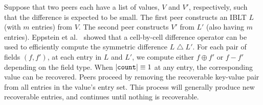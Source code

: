 Suppose that two peers each have a list of values, $V$ and $V'$,
respectively, such that the difference is expected to be small.  The
first peer constructs an IBLT $L$ (with $m$ entries) from $V$.  The
second peer constructs $V'$ from $L'$ (also having $m$ entries).
Eppstein et al.~\cite{eppstein:2011} showed that a cell-by-cell
difference operator can be used to efficiently compute the symmetric
difference $L \bigtriangleup L'$.  For each pair of fields $(f, f')$,
at each entry in $L$ and $L'$, we compute either $f \oplus f'$ or
\mbox{$f - f'$} depending on the field type.  When
$|\mbox{\texttt{count}}| \equiv 1$ at any entry, the corresponding
value can be recovered.  
  Peers proceed by removing the recoverable key-value pair from all entries in the value's entry set.
This process will generally produce new recoverable entries, and
continues until nothing is recoverable.

